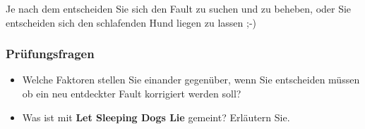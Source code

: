 Je nach dem entscheiden Sie sich den Fault zu suchen und zu beheben, oder Sie entscheiden sich den schlafenden Hund liegen zu lassen ;-)

\subsubsection*{Prüfungsfragen}

\begin{itemize}
	\item Welche Faktoren stellen Sie einander gegenüber, wenn Sie entscheiden müssen ob ein neu entdeckter Fault korrigiert werden soll?
	\item Was ist mit \textbf{Let Sleeping Dogs Lie} gemeint? Erläutern Sie.
\end{itemize}

